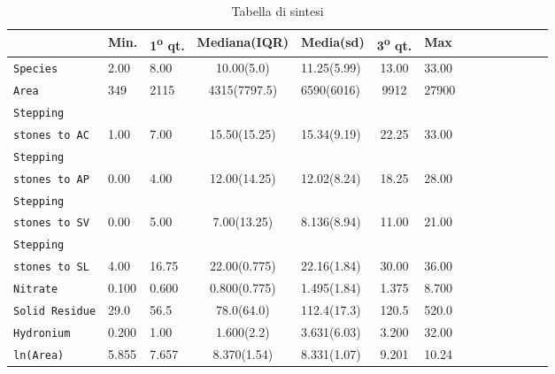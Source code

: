 \documentclass{article} %
\begin{document}
\begin{table}[H]
    \centering
    \renewcommand{\arraystretch}{1.4} %
    \begin{tabularx}{\textwidth}{p{69pt}l p{30pt}c p{45pt}c p{35pt}c p{40pt}c p{30pt}c p{27pt}r}
        \toprule
        & Min. & 1\textsuperscript{o} qt. & Mediana(IQR) & Media(sd) & 3\textsuperscript{o} qt. & Max\\
            \midrule  
            \texttt{Species} & 2.00 & 8.00 & 10.00(5.0) & 11.25(5.99) & 13.00 & 33.00 \\
            \texttt{Area} & 349 & 2115 & 4315(7797.5) & 6590(6016) & 9912 & 27900 \\
            \texttt{Stepping}\\ \texttt{stones to AC} & 1.00 & 7.00 & 15.50(15.25) & 15.34(9.19) & 22.25 & 33.00 \\
            \texttt{Stepping }\\
            \texttt{stones to AP} & 0.00 & 4.00 & 12.00(14.25) & 12.02(8.24) & 18.25 & 28.00 \\
            \texttt{Stepping }\\
            \texttt{stones to SV} & 0.00 & 5.00 & 7.00(13.25) & 8.136(8.94) & 11.00 & 21.00 \\
            \texttt{Stepping }\\
            \texttt{stones to SL} & 4.00 & 16.75 & 22.00(0.775) & 22.16(1.84) & 30.00 & 36.00 \\
            \texttt{Nitrate} & 0.100 & 0.600 & 0.800(0.775) & 1.495(1.84) & 1.375 & 8.700 \\
            \texttt{Solid Residue} & 29.0 & 56.5 & 78.0(64.0) & 112.4(17.3) & 120.5 & 520.0 \\
            \texttt{Hydronium} & 0.200 & 1.00 & 1.600(2.2) & 3.631(6.03) & 3.200 & 32.00 \\
            \texttt{ln(Area)} & 5.855 & 7.657 & 8.370(1.54) & 8.331(1.07) & 9.201 & 10.24 \\
        \bottomrule
    \end{tabularx}
    \caption{Tabella di sintesi}
\end{table}
\end{document}
